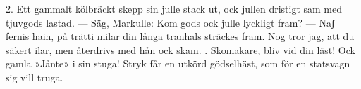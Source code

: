 \begin{multicols}{2}
2.  Ett gammalt kölbräckt skepp sin julle
    stack ut, ock jullen dristigt sam
    med tjuvgods lastad. — Säg, Markulle:
    Kom gods ock julle lyckligt fram? —
    Naʃ fernis hain, på trätti milar
    din långa tranhals sträckes fram.
    Nog tror jag, att du säkert ilar,
    men återdrivs med hån ock skam.
\vfill{}.  Skomakare, bliv vid din läst!
    Ock gamla »Jånte» i sin stuga!
    Stryk får en utkörd gödselhäst,
    som för en statsvagn sig vill truga.
\end{multicols}
